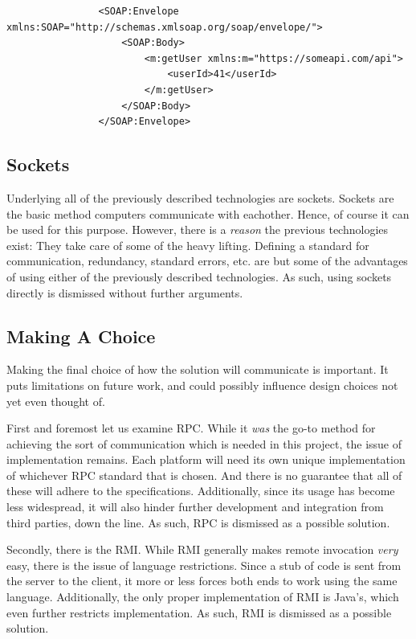 			\begin{verbatim}
				<SOAP:Envelope xmlns:SOAP="http://schemas.xmlsoap.org/soap/envelope/">
				    <SOAP:Body>
				        <m:getUser xmlns:m="https://someapi.com/api">
				            <userId>41</userId>
				        </m:getUser>
				    </SOAP:Body>
				</SOAP:Envelope>
			\end{verbatim}

		\subsection{Sockets}
			Underlying all of the previously described technologies are sockets. Sockets are the basic method computers communicate with eachother. Hence, of course it can be used for this purpose. However, there is a \emph{reason} the previous technologies exist: They take care of some of the heavy lifting. Defining a standard for communication, redundancy, standard errors, etc. are but some of the advantages of using either of the previously described technologies. As such, using sockets directly is dismissed without further arguments. 

		\subsection{Making A Choice}
			\label{sec:design:choosing-rest}
			Making the final choice of how the solution will communicate is important. It puts limitations on future work, and could possibly influence design choices not yet even thought of. 

			First and foremost let us examine RPC. While it \emph{was} the go-to method for achieving the sort of communication which is needed in this project, the issue of implementation remains. Each platform will need its own unique implementation of whichever RPC standard that is chosen. And there is no guarantee that all of these will adhere to the specifications. Additionally, since its usage has become less widespread, it will also hinder further development and integration from third parties, down the line. As such, RPC is dismissed as a possible solution.

			Secondly, there is the RMI. While RMI generally makes remote invocation \emph{very} easy, there is the issue of language restrictions. Since a stub of code is sent from the server to the client, it more or less forces both ends to work using the same language. Additionally, the only proper implementation of RMI is Java's, which even further restricts implementation. As such, RMI is dismissed as a possible solution.

